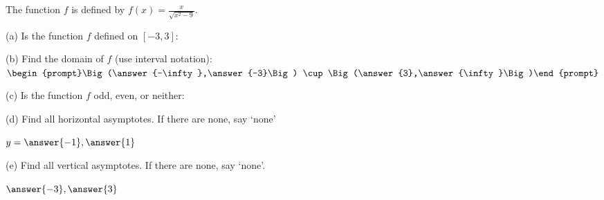 \documentclass{ximera}
\author{Tom Dinitz and Nela Lakos}
\begin{document}
\begin{exercise}

The function $f$ is defined by $f(x)=\frac{x}{\sqrt{x^2-9}}$.

(a) Is the function $f$ defined on $[-3,3]$:
\begin{prompt}
\begin{multipleChoice}
\end{multipleChoice}
\end{prompt}

(b) Find the domain of $f$ (use interval notation): $\begin{prompt}\Big(\answer{-\infty},\answer{-3}\Big) \cup \Big(\answer{3},\answer{\infty}\Big)\end{prompt}$

(c) Is the function $f$ odd, even, or neither:
\begin{prompt}
\begin{multipleChoice}
\end{multipleChoice}
\end{prompt} 

(d) Find all horizontal asymptotes. If there are none, say `none'
\begin{prompt} $y=\answer{-1},\answer{1}$\end{prompt}

(e) Find all vertical asymptotes. If there are none, say `none'.
\begin{prompt} $\answer{-3},\answer{3}$\end{prompt}

\end{exercise}
\end{document}
